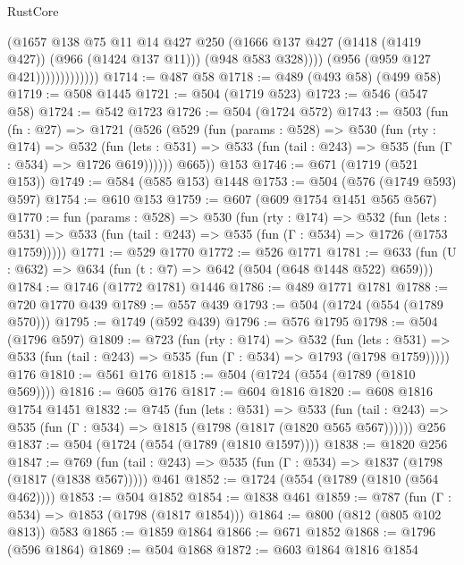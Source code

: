 \begin{lexlean}{RustCore}
\begin{coremodule}
                              (@1657
                                @138
                                @75
                                @11
                                @14
                                @427
                                @250
                                (@1666 @137 @427 (@1418 (@1419 @427)) (@966 (@1424 @137 @11)))
                                (@948 @583 @328))))
                          (@956 (@959 @127 @421)))))))))))))
@1714 := @487 @58
@1718 := @489 (@493 @58) (@499 @58)
@1719 := @508 @1445
@1721 := @504 (@1719 @523)
@1723 := @546 (@547 @58)
@1724 := @542 @1723
@1726 := @504 (@1724 @572)
@1743 := @503
    (fun (fn : @27) =>
    @1721
      (@526
        (@529
          (fun (params : @528) =>
          @530
            (fun (rty : @174) =>
            @532
              (fun (lets : @531) =>
              @533 (fun (tail : @243) => @535 (fun (Γ : @534) => @1726 @619))))))
        @665))
    @153
@1746 := @671 (@1719 (@521 @153))
@1749 := @584 (@585 @153) @1448
@1753 := @504 (@576 (@1749 @593) @597)
@1754 := @610 @153
@1759 := @607 (@609 @1754 @1451 @565 @567)
@1770 := fun (params : @528) =>
  @530
    (fun (rty : @174) =>
    @532
      (fun (lets : @531) =>
      @533 (fun (tail : @243) => @535 (fun (Γ : @534) => @1726 (@1753 @1759)))))
@1771 := @529 @1770
@1772 := @526 @1771
@1781 := @633 (fun (U : @632) => @634 (fun (t : @7) => @642 (@504 (@648 @1448 @522) @659)))
@1784 := @1746 (@1772 @1781) @1446
@1786 := @489 @1771 @1781
@1788 := @720 @1770 @439
@1789 := @557 @439
@1793 := @504 (@1724 (@554 (@1789 @570)))
@1795 := @1749 (@592 @439)
@1796 := @576 @1795
@1798 := @504 (@1796 @597)
@1809 := @723
    (fun (rty : @174) =>
    @532
      (fun (lets : @531) =>
      @533 (fun (tail : @243) => @535 (fun (Γ : @534) => @1793 (@1798 @1759)))))
    @176
@1810 := @561 @176
@1815 := @504 (@1724 (@554 (@1789 (@1810 @569))))
@1816 := @605 @176
@1817 := @604 @1816
@1820 := @608 @1816 @1754 @1451
@1832 := @745
    (fun (lets : @531) =>
    @533 (fun (tail : @243) => @535 (fun (Γ : @534) => @1815 (@1798 (@1817 (@1820 @565 @567))))))
    @256
@1837 := @504 (@1724 (@554 (@1789 (@1810 @1597))))
@1838 := @1820 @256
@1847 := @769
    (fun (tail : @243) => @535 (fun (Γ : @534) => @1837 (@1798 (@1817 (@1838 @567)))))
    @461
@1852 := @1724 (@554 (@1789 (@1810 (@564 @462))))
@1853 := @504 @1852
@1854 := @1838 @461
@1859 := @787 (fun (Γ : @534) => @1853 (@1798 (@1817 @1854)))
@1864 := @800 (@812 (@805 @102 @813)) @583
@1865 := @1859 @1864
@1866 := @671 @1852
@1868 := @1796 (@596 @1864)
@1869 := @504 @1868
@1872 := @603 @1864 @1816 @1854

\end{coremodule}
\end{lexlean}
